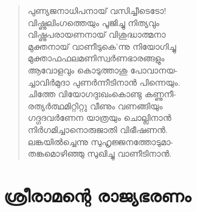 \begin{verse}
പുണ്യജനാധിപനായ് വസിച്ചീടെടോ!\\
വിഷ്ണുലിംഗത്തെയും പൂജിച്ചു നിത്യവും\\
വിഷ്ണുപരായണനായ് വിശുദ്ധാത്മനാ\\
മുക്തനായ് വാണീടുകെ’ന്നു നിയോഗിച്ചു\\
മുക്താഫഫലമണിസ്വര്‍ണഭാരങ്ങളും\\
ആവോളവും കൊടുത്താശു പോവാനയ-\\
ച്ചാവിര്‍മുദാ പുണര്‍ന്നീടിനാന്‍ പിന്നെയും.\\
ചിത്തേ വിയോഗദുഃഖംകൊണ്ടു കണ്ണുനീ-\\
രത്യര്‍ത്ഥമിറ്റിറ്റു വീണും വണങ്ങിയും\\
ഗദ്ഗദവര്‍ണേന യാത്രയും ചൊല്ലിനാന്‍\\
നിര്‍ഗമിച്ചാനൊരുജാതി വിഭീഷണന്‍.\\
ലങ്കയില്‍ച്ചെന്നു സുഹൃജ്ജനത്തോടുമാ-\\
തങ്കമൊഴിഞ്ഞു സുഖിച്ചു വാണീടിനാന്‍.
\end{verse}


\section{ശ്രീരാമന്റെ രാജ്യഭരണം}

